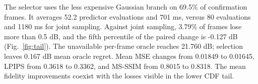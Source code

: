 The selector uses the less expensive Gaussian branch on 69.5\% of confirmation frames. It averages 52.2 predictor evaluations and 701 ms, versus 80 evaluations and 1180 ms for joint sampling. Against joint sampling, 3.79\% of frames lose more than 0.5 dB, and the fifth percentile of the paired change is -0.127 dB (Fig.~\ref{fig:tail}). The unavailable per-frame oracle reaches 21.760 dB; selection leaves 0.167 dB mean oracle regret. Mean MSE changes from 0.01849 to 0.01645, LPIPS from 0.3618 to 0.3362, and MS-SSIM from 0.8015 to 0.8318. The mean fidelity improvements coexist with the losses visible in the lower CDF tail.
